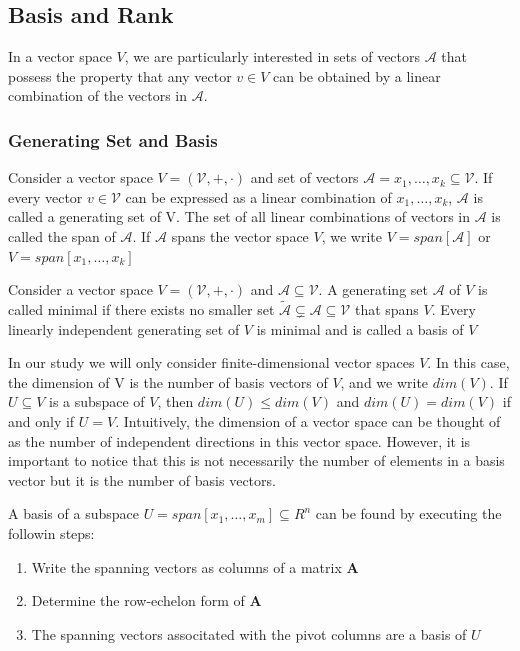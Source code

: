 \subsection*{Basis and Rank}
In a vector space $V$, we are particularly interested in sets of vectors $\mathcal{A}$ that possess the property that any vector $v \in V$ can be obtained by a linear combination of the vectors in $\mathcal{A}$.
\subsubsection*{Generating Set and Basis}
\begin{definition}
    Consider a vector space $V = (\mathcal{V},+,\cdot)$ and set of vectors $\mathcal{A} = {x_1,\ldots,x_k} \subseteq \mathcal{V}$. If every vector $v \in \mathcal{V}$ can be expressed as a linear combination of $x_1, \ldots, x_k$, $\mathcal{A}$ is called a generating set of V. The set of all linear combinations of vectors in $\mathcal{A}$ is called the span of $\mathcal{A}$. If $\mathcal{A}$ spans the vector space $V$, we write $V = span[\mathcal{A}]$ or $V = span[x_1,\ldots,x_k]$
\end{definition}
\begin{definition}[Basis]
    Consider a vector space $V = (\mathcal{V},+,\cdot)$ and $\mathcal{A} \subseteq \mathcal{V}$. A generating set $\mathcal{A}$ of $V$ is called minimal if there exists no smaller set $\tilde{\mathcal{A}}\subsetneq \mathcal{A} \subseteq \mathcal{V}$ that spans $V$. Every linearly independent generating set of $V$ is minimal and is called a basis of $V$
\end{definition}
In our study we will only consider finite-dimensional vector spaces $V$. In this case, the dimension of V is the number of basis vectors of $V$, and we write $dim(V)$. If $U\subseteq V$ is a subspace of $V$, then $dim(U) \leq dim(V)$ and $dim(U) = dim(V)$ if and only if $U=V$. Intuitively, the dimension of a vector space can be thought of as the number of independent directions in this vector space. However, it is important to notice that this is not necessarily the number of elements in a basis vector but it is the number of basis vectors.
\begin{remark}
    A basis of a subspace $U = span[x_1,\ldots,x_m] \subseteq R^n$ can be found by executing the followin steps:
    \begin{enumerate}
        \item Write the spanning vectors as columns of a matrix $\mathbf{A}$
        \item Determine the row-echelon form of $\mathbf{A}$
        \item The spanning vectors associtated with the pivot columns are a basis of $U$
    \end{enumerate}
\end{remark}

